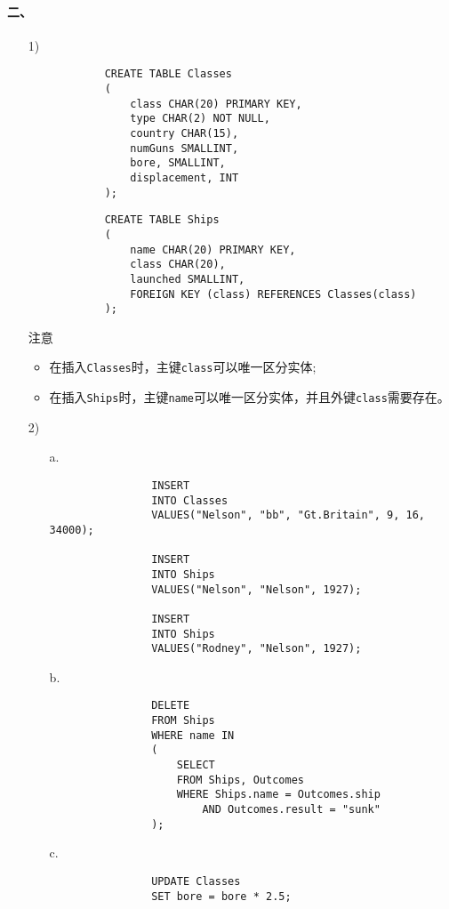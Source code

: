 \documentclass[10pt,a4paper]{article}
\begin{document}
    \paragraph{二、}
    \begin{enumerate}
        \item[1)]\begin{verbatim}
            CREATE TABLE Classes
            (
                class CHAR(20) PRIMARY KEY,
                type CHAR(2) NOT NULL,
                country CHAR(15),
                numGuns SMALLINT,
                bore, SMALLINT,
                displacement, INT
            );
        \end{verbatim}
        
        \begin{verbatim}
            CREATE TABLE Ships
            (
                name CHAR(20) PRIMARY KEY,
                class CHAR(20),
                launched SMALLINT,
                FOREIGN KEY (class) REFERENCES Classes(class)
            );
        \end{verbatim}

        注意
        \begin{itemize}
            \item 在插入\texttt{Classes}时，主键\texttt{class}可以唯一区分实体;
            \item 在插入\texttt{Ships}时，主键\texttt{name}可以唯一区分实体，并且外键\texttt{class}需要存在。
        \end{itemize}
        \item[2)]\begin{itemize}
            \item[a.]\begin{verbatim}
                INSERT 
                INTO Classes
                VALUES("Nelson", "bb", "Gt.Britain", 9, 16, 34000);

                INSERT
                INTO Ships
                VALUES("Nelson", "Nelson", 1927);

                INSERT
                INTO Ships
                VALUES("Rodney", "Nelson", 1927);
            \end{verbatim}
            \item[b.]\begin{verbatim}
                DELETE
                FROM Ships
                WHERE name IN
                (
                    SELECT
                    FROM Ships, Outcomes
                    WHERE Ships.name = Outcomes.ship
                        AND Outcomes.result = "sunk"
                );
            \end{verbatim}
            \item[c.]\begin{verbatim}
                UPDATE Classes
                SET bore = bore * 2.5;


\end{verbatim}
\end{itemize}
\end{enumerate}
\end{document}
